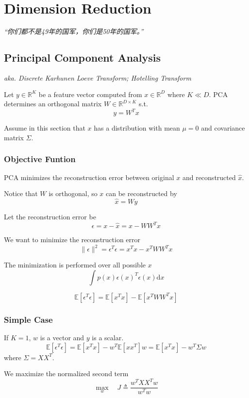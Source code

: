 \chapter{Dimension Reduction}
\emph{“你们都不是49年的国军，你们是50年的国军。”}
\newpage


\section{Principal Component Analysis}
    \emph{aka. Discrete Karhunen Loeve Transform; Hotelling Transform}

    Let $y \in \mathbb{R}^K$ be a feature vector computed from $x \in \mathbb{R}^D$ where $K \ll D$. PCA determines an orthogonal matrix $W \in \mathbb{R}^{D \times K}$ s.t.
    \[ y = W^Tx \]

    Assume in this section that $x$ has a distribution with mean $\mu=0$ and covariance matrix $\Sigma$.

    \subsection{Objective Funtion}
        PCA minimizes the reconstruction error between original $x$ and reconstructed $\hat{x}$.

        Notice that $W$ is orthogonal, so $x$ can be reconstructed by
        \[ \hat{x} = Wy \]

        Let the reconstruction error be
        \[ \epsilon = x - \hat{x} = x - WW^Tx \]

        We want to minimize the reconstruction error
        \[ \|\epsilon\|^2 = \epsilon^T\epsilon = x^Tx - x^TWW^Tx \]

        The minimization is performed over all possible $x$
        \[ \int p(x)\epsilon(x)^T\epsilon(x)\mathrm{d}x \]

        \[ \mathbb{E}[\epsilon^T\epsilon] = \mathbb{E}[x^Tx] - \mathbb{E}[x^TWW^Tx]\]

    \subsection{Simple Case}
        If $K=1$, $w$ is a vector and $y$ is a scalar.
        \[\mathbb{E}[\epsilon^T\epsilon] = \mathbb{E}[x^Tx]-w^T\mathbb{E}[xx^T]w = \mathbb{E}[x^Tx] - w^T \Sigma w\]
        where $\Sigma = XX^T$.

        We maximize the normalized second term
        \[ \max_w \quad J \triangleq \frac{w^TXX^Tw}{w^Tw} \]

